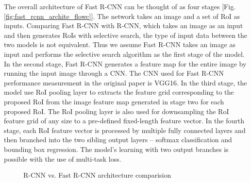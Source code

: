 The overall architecture of Fast R-CNN can be thought of as four stages [Fig. \ref{fig:fast_rcnn_archite_flowc}]. The network takes an image and a set of RoI as inputs. Comparing Fast R-CNN with R-CNN, which takes an image as an input and then generates RoIs with selective search, the type of input data between the two models is not equivalent. Thus we assume Fast R-CNN takes an image as input and performs the selective search algorithm as the first stage of the model. In the second stage, Fast R-CNN generates a feature map for the entire image by running the input image through a CNN. The CNN used for Fast R-CNN performance measurement in the original paper is VGG16. In the third stage, the model use RoI pooling layer to extracts the feature grid corresponding to the proposed RoI from the image feature map generated in stage two for each proposed RoI. The RoI pooling layer is also used for downsampling the RoI feature grid of any size to a pre-defined fixed-length feature vector. In the fourth stage, each RoI feature vector is processed by multiple fully connected layers and then branched into the two sibling output layers -- softmax classification and bounding box regression. The model's learning with two output branches is possible with the use of multi-task loss.

\begin{figure}[!ht]
    \centering
    \caption{R-CNN vs. Fast R-CNN architecture comparision} \label{fig:rcnn_vs_fast}
\end{figure}

